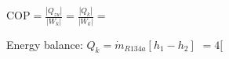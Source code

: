 \( \text{COP} = \frac{|Q_{zu}|}{|W_{k}|} = \frac{|Q_{k}|}{|W_{k}|} = \)  

Energy balance:  
\( Q_k = \dot{m}_{R134a} [h_1 - h_2] \)  
\( = 4 [ \)
